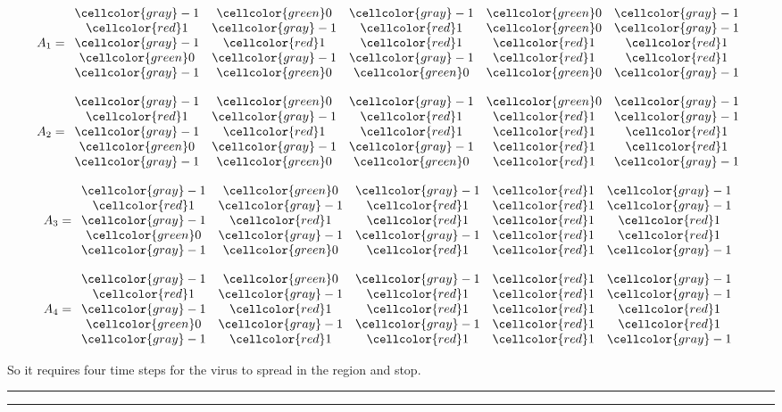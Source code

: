 \documentclass[11pt,twoside]{article}
\newcommand{\immune}{\cellcolor{gray} -1 }
\newcommand{\negative}{\cellcolor{green} 0 }
\newcommand{\positive}{\cellcolor{red} 1}
\newcounter{problem}
\newcommand{\solution}{\bigskip\hrule\bigskip}
\newcommand{\problembreak}{\bigskip\hrule\bigskip}
\begin{document}
\begin{equation*}
A_1 = 
\begin{array}{ccccc}
\immune & \negative & \immune & \negative &  \immune   \\
\positive & \immune & \positive & \negative &  \immune   \\
\immune & \positive & \positive & \positive &  \positive   \\
\negative & \immune & \immune  & \positive &  \positive   \\
\immune & \negative & \negative & \negative & \immune   \\
\end{array}
\end{equation*}


\begin{equation*}
A_2 = 
\begin{array}{ccccc}
\immune & \negative & \immune & \negative &  \immune   \\
\positive & \immune & \positive & \positive &  \immune   \\
\immune & \positive & \positive & \positive &  \positive   \\
\negative & \immune & \immune  & \positive &  \positive   \\
\immune & \negative & \negative & \positive & \immune   \\
\end{array}
\end{equation*}

\begin{equation*}
A_3 = 
\begin{array}{ccccc}
\immune & \negative & \immune & \positive &  \immune   \\
\positive & \immune & \positive & \positive &  \immune   \\
\immune & \positive & \positive & \positive &  \positive   \\
\negative & \immune & \immune  & \positive &  \positive   \\
\immune & \negative & \positive & \positive & \immune   \\
\end{array}
\end{equation*}


\begin{equation*}
A_4 = 
\begin{array}{ccccc}
\immune & \negative & \immune & \positive &  \immune   \\
\positive & \immune & \positive & \positive &  \immune   \\
\immune & \positive & \positive & \positive &  \positive   \\
\negative & \immune & \immune  & \positive &  \positive   \\
\immune & \positive & \positive & \positive & \immune   \\
\end{array}
\end{equation*}

So it requires four time steps
for the virus to spread in the region and stop.

\solution


\problembreak
\end{document}
